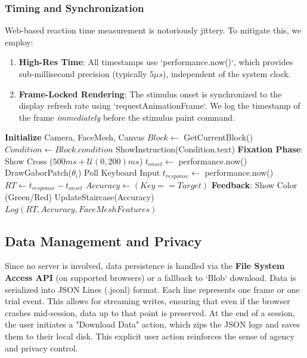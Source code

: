 \documentclass[journal]{IEEEtran}
\begin{document}
\subsubsection{Timing and Synchronization}
Web-based reaction time measurement is notoriously jittery. To mitigate this, we employ:
\begin{enumerate}
    \item \textbf{High-Res Time}: All timestamps use `performance.now()`, which provides sub-millisecond precision (typically $5\mu s$), independent of the system clock.
    \item \textbf{Frame-Locked Rendering}: The stimulus onset is synchronized to the display refresh rate using `requestAnimationFrame`. We log the timestamp of the frame \textit{immediately} before the stimulus paint command.
\end{enumerate}

\begin{algorithm}
\caption{Camerala Task Loop (Simplified)}
\begin{algorithmic}
\STATE \textbf{Initialize} Camera, FaceMesh, Canvas
    \STATE $Block \leftarrow$ GetCurrentBlock()
    \STATE $Condition \leftarrow Block.condition$
    \STATE ShowInstruction(Condition.text)
        \STATE \textbf{Fixation Phase}: Show Cross ($500ms + \mathcal{U}(0, 200)ms$)
        \STATE $t_{onset} \leftarrow$ performance.now()
        \STATE DrawGaborPatch($\theta_i$)
            \STATE Poll Keyboard Input
        \ENDWHILE
        \STATE $t_{response} \leftarrow$ performance.now()
        \STATE $RT \leftarrow t_{response} - t_{onset}$
        \STATE $Accuracy \leftarrow (Key == Target)$
        \STATE \textbf{Feedback}: Show Color (Green/Red)
        \STATE UpdateStaircase(Accuracy)
        \STATE $Log(RT, Accuracy, FaceMeshFeatures)$
    \ENDFOR
\ENDWHILE
\end{algorithmic}
\end{algorithm}

\subsection{Data Management and Privacy}
Since no server is involved, data persistence is handled via the \textbf{File System Access API} (on supported browsers) or a fallback to `Blob` download.
Data is serialized into JSON Lines (.jsonl) format. Each line represents one frame or one trial event. This allows for streaming writes, ensuring that even if the browser crashes mid-session, data up to that point is preserved.
At the end of a session, the user initiates a "Download Data" action, which zips the JSON logs and saves them to their local disk. This explicit user action reinforces the sense of agency and privacy control.
\end{document}
